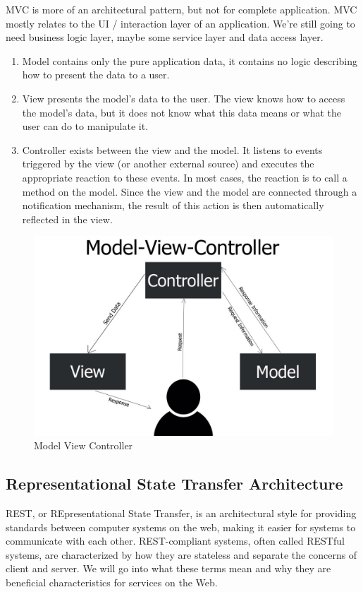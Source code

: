 MVC is more of an architectural pattern, but not for complete application. MVC mostly relates to the UI / interaction layer of an application. We’re still going to need business logic layer, maybe some service layer and data access layer.
\begin{enumerate}
      \item Model contains only the pure application data, it contains no logic describing how to present the data to a user.
      \item View presents the model’s data to the user. The view knows how to access the model’s data, but it does not know what this data means or what the user can do to manipulate it.
      \item Controller exists between the view and the model. It listens to events triggered by the view (or another external source) and executes the appropriate reaction to these events. In most cases, the reaction is to call a method on the model. Since the view and the model are connected through a notification mechanism, the result of this action is then automatically reflected in the view.
\end{enumerate}

\begin{figure}[!ht]
      \center
      \includegraphics[scale=0.30]{assets/mvc.jpg}
      \caption{Model View Controller}
      \label{fig:mvc}
\end{figure}
\subsection{Representational State Transfer Architecture}
REST, or REpresentational State Transfer, is an architectural style for providing standards between computer systems on the web, making it easier for systems to communicate with each other. REST-compliant systems, often called RESTful systems, are characterized by how they are stateless and separate the concerns of client and server. We will go into what these terms mean and why they are beneficial characteristics for services on the Web.
